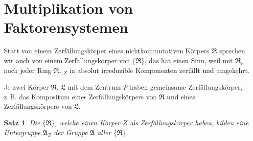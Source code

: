 \documentclass[12pt,a4paper]{article}
\theoremstyle{plain}
\newtheorem{satz}{Satz}[section]
\theoremstyle{definition}
\theoremstyle{remark}
\begin{document}
\newpage
\section{Multiplikation von Faktorensystemen}\label{sec:24}

Statt von einem Zerf\"allungsk\"orper eines nichtkommutativen K\"orpers
$\mathfrak{R}$ sprechen wir auch von einem Zerf\"allungsk\"orper von $\{\mathfrak{R}\}$, das hat einen
Sinn, weil mit $\mathfrak{R}_{r}$ auch jeder Ring $\mathfrak{R}_{r,Z}$ in absolut irreduzible Komponenten
zerf\"allt und umgekehrt.

Je zwei K\"orper $\mathfrak{R}$, $\mathfrak{L}$ mit dem Zentrum $P$ haben gemeinsame
Zerf\"allungsk\"orper, z.\,B. das Kompositum eines Zerf\"allungsk\"orpers von
$\mathfrak{R}$ und eines Zerf\"allungsk\"orpers von $\mathfrak{L}$.

\begin{satz}\label{satz:24-1}
Die $\{\mathfrak{R}\}$, welche einen K\"orper $Z$ als Zerf\"allungsk\"orper haben, bilden eine
Untergruppe $\mathfrak{A}_{Z}$ der Gruppe $\mathfrak{A}$ aller $\{\mathfrak{R}\}$.
\end{satz}
\end{document}
